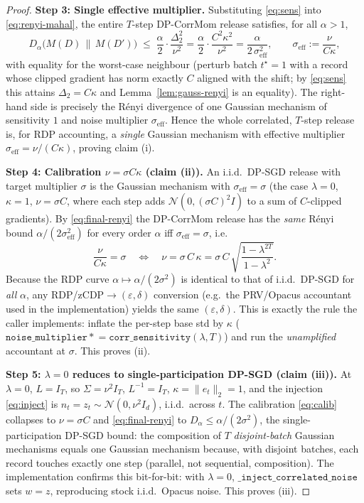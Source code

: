 \begin{proof}
\medskip
\noindent\textbf{Step 3: Single effective multiplier.}
Substituting \eqref{eq:sens} into \eqref{eq:renyi-mahal}, the entire $T$-step DP-CorrMom release
satisfies, for all $\alpha>1$,
\begin{equation}
D_\alpha\big(M(D)\,\|\,M(D')\big)\;\le\;\frac{\alpha}{2}\cdot\frac{\Delta_2^2}{\nu^2}
=\frac{\alpha}{2}\cdot\frac{C^2\kappa^2}{\nu^2}
=\frac{\alpha}{2\,\sigma_{\mathrm{eff}}^2},
\qquad
\sigma_{\mathrm{eff}}:=\frac{\nu}{C\kappa},
\label{eq:final-renyi}
\end{equation}
with equality for the worst-case neighbour (perturb batch $t^\star=1$ with a record whose clipped
gradient has norm exactly $C$ aligned with the shift; by \eqref{eq:sens} this attains $\Delta_2=C\kappa$
and Lemma~\ref{lem:gauss-renyi} is an equality). The right-hand side is precisely the R\'enyi
divergence of one Gaussian mechanism of sensitivity $1$ and noise multiplier $\sigma_{\mathrm{eff}}$.
Hence the whole correlated, $T$-step release is, for RDP accounting, a \emph{single} Gaussian mechanism
with effective multiplier $\sigma_{\mathrm{eff}}=\nu/(C\kappa)$, proving claim (i).

\medskip
\noindent\textbf{Step 4: Calibration $\nu=\sigma C\kappa$ (claim (ii)).}
An i.i.d.\ DP-SGD release with target multiplier $\sigma$ is the Gaussian mechanism with
$\sigma_{\mathrm{eff}}=\sigma$ (the case $\lambda=0$, $\kappa=1$, $\nu=\sigma C$, where each step adds
$\mathcal N(0,(\sigma C)^2 I)$ to a sum of $C$-clipped gradients). By \eqref{eq:final-renyi} the
DP-CorrMom release has the \emph{same} R\'enyi bound $\alpha/(2\sigma_{\mathrm{eff}}^2)$ for every order
$\alpha$ iff $\sigma_{\mathrm{eff}}=\sigma$, i.e.
\[
\frac{\nu}{C\kappa}=\sigma
\quad\Longleftrightarrow\quad
\nu=\sigma\,C\,\kappa=\sigma\,C\,\sqrt{\frac{1-\lambda^{2T}}{1-\lambda^2}} .
\]
Because the RDP curve $\alpha\mapsto \alpha/(2\sigma^2)$ is identical to that of i.i.d.\ DP-SGD for
\emph{all} $\alpha$, any RDP/zCDP$\to(\varepsilon,\delta)$ conversion (e.g.\ the PRV/Opacus accountant
used in the implementation) yields the same $(\varepsilon,\delta)$. This is exactly the rule the caller
implements: inflate the per-step base std by $\kappa$
($\texttt{noise\_multiplier}\mathrel{*}{=}\texttt{corr\_sensitivity}(\lambda,T)$) and run the
\emph{unamplified} accountant at $\sigma$. This proves (ii).

\medskip
\noindent\textbf{Step 5: $\lambda=0$ reduces to single-participation DP-SGD (claim (iii)).}
At $\lambda=0$, $L=I_T$, so $\Sigma=\nu^2 I_T$, $L^{-1}=I_T$, $\kappa=\|e_t\|_2=1$, and the injection
\eqref{eq:inject} is $n_t=z_t\sim\mathcal N(0,\nu^2 I_d)$, i.i.d.\ across $t$. The calibration
\eqref{eq:calib} collapses to $\nu=\sigma C$ and \eqref{eq:final-renyi} to $D_\alpha\le\alpha/(2\sigma^2)$,
the single-participation DP-SGD bound: the composition of $T$ \emph{disjoint-batch} Gaussian mechanisms
equals one Gaussian mechanism because, with disjoint batches, each record touches exactly one step
(parallel, not sequential, composition). The implementation confirms this bit-for-bit: with
$\lambda=0$, $\texttt{\_inject\_correlated\_noise}$ sets $w=z$, reproducing stock i.i.d.\ Opacus noise.
This proves (iii).


\end{proof}
